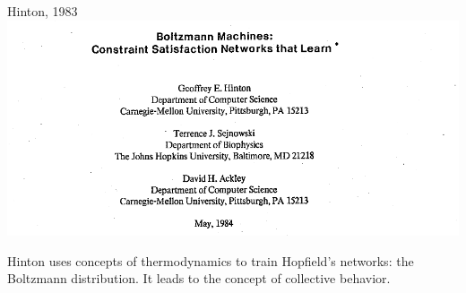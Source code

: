 \documentclass{beamer}
\begin{document}
\begin{frame}{Hinton, 1983}
    \centering
    \includegraphics[scale=0.4]{pics/HintonPaper.png}

Hinton uses concepts of thermodynamics to train Hopfield's networks: the Boltzmann distribution. It leads to the concept of collective behavior.
\end{frame}
\end{document}
